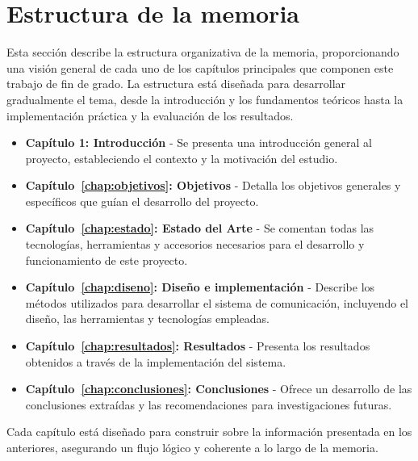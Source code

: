 \documentclass[a4paper, 12pt]{book}
\begin{document}
\section{Estructura de la memoria}
\label{sec:estructura}
Esta sección describe la estructura organizativa de la memoria, proporcionando una visión 
general de cada uno de los capítulos principales que componen este trabajo de fin de grado. 
La estructura está diseñada para desarrollar gradualmente el tema, desde la introducción y 
los fundamentos teóricos hasta la implementación práctica y la evaluación de los resultados.

\begin{itemize}
  \item \textbf{Capítulo 1: Introducción} - Se presenta una introducción general al proyecto, estableciendo el contexto y 
  la motivación del estudio.
  
  \item \textbf{Capítulo~\ref{chap:objetivos}: Objetivos} - Detalla los objetivos generales y específicos que guían el desarrollo del proyecto.
  
  \item \textbf{Capítulo~\ref{chap:estado}: Estado del Arte} - Se comentan todas las tecnologías, herramientas y accesorios necesarios
 para el desarrollo y funcionamiento de este proyecto.
  
  \item \textbf{Capítulo~\ref{chap:diseno}: Diseño e implementación} - Describe los métodos utilizados para desarrollar el sistema de comunicación, 
  incluyendo el diseño, las herramientas y tecnologías empleadas.
  
  \item \textbf{Capítulo~\ref{chap:resultados}: Resultados} - Presenta los resultados obtenidos a través de la implementación del sistema.
  
  \item \textbf{Capítulo~\ref{chap:conclusiones}: Conclusiones} - Ofrece un desarrollo de las conclusiones extraídas y 
  las recomendaciones para investigaciones futuras.
\end{itemize}

Cada capítulo está diseñado para construir sobre la información presentada en los anteriores, asegurando un 
flujo lógico y coherente a lo largo de la memoria.




\end{document}
